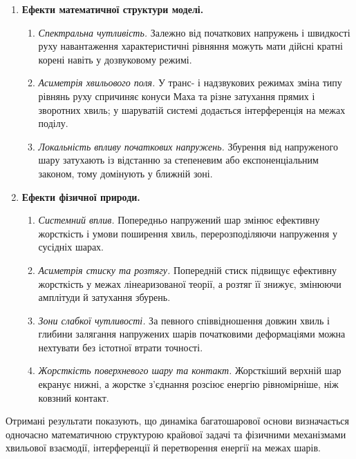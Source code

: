 \begin{enumerate}[label=\arabic*.,leftmargin=2em,itemsep=0.25em]
\item \textbf{Ефекти математичної структури моделі.}
  \begin{enumerate}[label*=\arabic*.,leftmargin=2.2em,itemsep=0.12em]
  \item \textit{Спектральна чутливість.} Залежно від початкових напружень і швидкості руху навантаження характеристичні рівняння можуть мати дійсні кратні корені навіть у дозвуковому режимі.
  \item \textit{Асиметрія хвильового поля.} У транс- і надзвукових режимах зміна типу рівнянь руху спричиняє конуси Маха та різне затухання прямих і зворотних хвиль; у шаруватій системі додається інтерференція на межах поділу.
  \item \textit{Локальність впливу початкових напружень.} Збурення від напруженого шару затухають із відстанню за степеневим або експоненціальним законом, тому домінують у ближній зоні.
  \end{enumerate}
\item \textbf{Ефекти фізичної природи.}
  \begin{enumerate}[label*=\arabic*.,leftmargin=2.2em,itemsep=0.12em]
  \item \textit{Системний вплив.} Попередньо напружений шар змінює ефективну жорсткість і умови поширення хвиль, перерозподіляючи напруження у сусідніх шарах.
  \item \textit{Асиметрія стиску та розтягу.} Попередній стиск підвищує ефективну жорсткість у межах лінеаризованої теорії, а розтяг її знижує, змінюючи амплітуди й затухання збурень.
  \item \textit{Зони слабкої чутливості.} За певного співвідношення довжин хвиль і глибини залягання напружених шарів початковими деформаціями можна нехтувати без істотної втрати точності.
  \item \textit{Жорсткість поверхневого шару та контакт.} Жорсткіший верхній шар екранує нижні, а жорстке з’єднання розсіює енергію рівномірніше, ніж ковзний контакт.
  \end{enumerate}
\end{enumerate}

Отримані результати показують, що динаміка багатошарової основи визначається одночасно математичною структурою крайової задачі та фізичними механізмами хвильової взаємодії, інтерференції й перетворення енергії на межах шарів.
